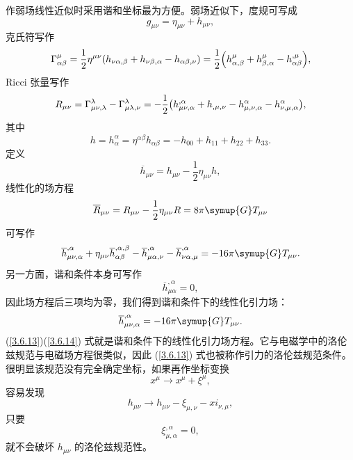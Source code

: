 \documentclass[UTF8, 12pt, a4paper, oneside, onecolumn, fontset=none]{ctexart}
\begin{document}
作弱场线性近似时采用谐和坐标最为方便。弱场近似下，度规可写成
\begin{equation}
g_{\mu\nu}=\eta_{\mu\nu}+h_{\mu\nu},
\end{equation}
克氏符写作
\begin{equation}
\Gamma_{\alpha\beta}^{\mu}=\frac{1}{2}\eta^{\mu\nu}\mleft(h_{\nu\alpha,\beta}+h_{\nu\beta,\alpha}-h_{\alpha\beta,\nu}\mright)=\frac{1}{2}\mleft(h_{\alpha,\beta}^{\mu}+h_{\beta,\alpha}^{\mu}-h_{\alpha\beta}^{,\mu}\mright),
\end{equation}
Ricci 张量写作
\begin{equation}
R_{\mu\nu}=\Gamma_{\mu\nu,\lambda}^{\lambda}-\Gamma_{\mu\lambda,\nu}^{\lambda}=-\frac{1}{2}\mleft(h_{\mu\nu,\alpha}^{,\alpha}+h_{,\mu,\nu}-h_{\mu,\nu,\alpha}^{\alpha}-h_{\nu,\mu,\alpha}^{\alpha}\mright),
\end{equation}
其中
\begin{equation}
h=h^{\alpha}_{\alpha}=\eta^{\alpha\beta}h_{\alpha\beta}=-h_{00}+h_{11}+h_{22}+h_{33}.
\end{equation}
定义
\begin{equation}
\overline{h}_{\mu\nu}=h_{\mu\nu}-\frac{1}{2}\eta_{\mu\nu}h,
\end{equation}
线性化的场方程
\begin{equation}
\overline{R}_{\mu\nu}=R_{\mu\nu}-\frac{1}{2}\eta_{\mu\nu}R=8\pi\symup{G}T_{\mu\nu}
\end{equation}
可写作
\begin{equation}
\overline{h}_{\mu\nu,\alpha}^{,\alpha}+\eta_{\mu\nu}\overline{h}_{\alpha\beta}^{,\alpha,\beta}-\overline{h}_{\mu\alpha,\nu}^{,\alpha}-\overline{h}_{\nu\alpha,\mu}^{,\alpha}=-16\pi\symup{G}T_{\mu\nu}.
\end{equation}
另一方面，谐和条件本身可写作
\begin{equation}
\overline{h}_{\mu\alpha}^{,\alpha}=0,\label{3.6.13}
\end{equation}
因此场方程后三项均为零，我们得到谐和条件下的线性化引力场：
\begin{equation}
\overline{h}_{\mu\nu,\alpha}^{,\alpha}=-16\pi\symup{G}T_{\mu\nu}.\label{3.6.14}
\end{equation}
(\ref{3.6.13})(\ref{3.6.14}) 式就是谐和条件下的线性化引力场方程。它与电磁学中的洛伦兹规范与电磁场方程很类似，因此 (\ref{3.6.13}) 式也被称作引力的洛伦兹规范条件。很明显该规范没有完全确定坐标，如果再作坐标变换
\begin{equation}
x^{\mu}\to x^{\mu}+\xi^{\mu},
\end{equation}
容易发现
\begin{equation}
h_{\mu\nu}\to h_{\mu\nu}-\xi_{\mu,\nu}-xi_{\nu,\mu},
\end{equation}
只要
\begin{equation}
\xi^{,\alpha}_{\mu,\alpha}=0,\label{3.6.17}
\end{equation}
就不会破坏 $h_{\mu\nu}$ 的洛伦兹规范性。
\end{document}
